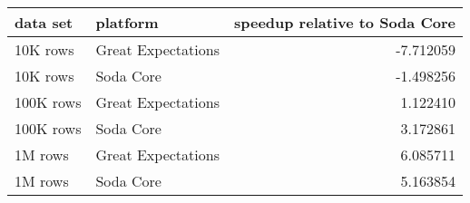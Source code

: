 \begin{tabular}{llr}
\toprule
data set & platform & speedup relative to Soda Core \\
\midrule
10K rows & Great Expectations & -7.712059 \\
10K rows & Soda Core & -1.498256 \\
100K rows & Great Expectations & 1.122410 \\
100K rows & Soda Core & 3.172861 \\
1M rows & Great Expectations & 6.085711 \\
1M rows & Soda Core & 5.163854 \\
\bottomrule
\end{tabular}
